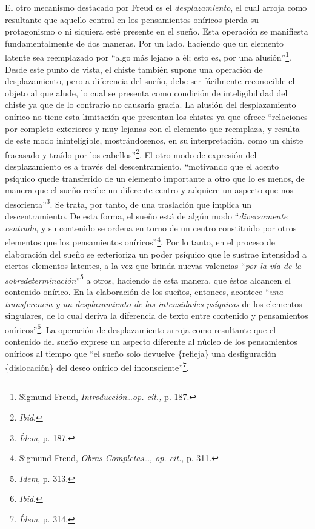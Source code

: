 El otro mecanismo destacado por Freud es el \emph{desplazamiento}, el
cual arroja como resultante que aquello central en los pensamientos
oníricos pierda su protagonismo o ni siquiera esté presente en el sueño.
Esta operación se manifiesta fundamentalmente de dos maneras. Por un
lado, haciendo que un elemento latente sea reemplazado por \enquote{algo más
lejano a él; esto es, por una alusión}\footnote{Sigmund Freud,
  \emph{Introducción\ldots op. cit.,} p. 187.}. Desde este punto de
vista, el chiste también supone una operación de desplazamiento, pero a
diferencia del sueño, debe ser fácilmente reconocible el objeto al que
alude, lo cual se presenta como condición de inteligibilidad del chiste
ya que de lo contrario no causaría gracia. La alusión del desplazamiento
onírico no tiene esta limitación que presentan los chistes ya que ofrece
\enquote{relaciones por completo exteriores y muy lejanas con el elemento que
reemplaza, y resulta de este modo ininteligible, mostrándosenos, en su
interpretación, como un chiste fracasado y traído por los
cabellos}\footnote{\emph{Ibíd}.}. El otro modo de expresión del
desplazamiento es a través del descentramiento, \enquote{motivando que el acento
psíquico quede transferido de un elemento importante a otro que lo es
menos, de manera que el sueño recibe un diferente centro y adquiere un
aspecto que nos desorienta}\footnote{\emph{Ídem}, p. 187.}. Se trata,
por tanto, de una traslación que implica un descentramiento. De esta
forma, el sueño está de algún modo \enquote{\emph{diversamente centrado}, y su
contenido se ordena en torno de un centro constituido por otros
elementos que los pensamientos oníricos}\footnote{Sigmund Freud,
  \emph{Obras Completas\ldots, op. cit.}, p. 311.}. Por lo tanto, en el
proceso de elaboración del sueño se exterioriza un poder psíquico que le
sustrae intensidad a ciertos elementos latentes, a la vez que brinda
nuevas valencias \enquote{\emph{por la vía de la sobredeterminación}}\footnote{\emph{Idem},
  p. 313.} a otros, haciendo de esta manera, que éstos alcancen el
contenido onírico. En la elaboración de los sueños, entonces, acontece
\enquote{\emph{una transferencia y un desplazamiento de las intensidades
psíquicas} de los elementos singulares, de lo cual deriva la diferencia
de texto entre contenido y pensamientos oníricos}\footnote{\emph{Ibid}.}.
La operación de desplazamiento arroja como resultante que el contenido
del sueño exprese un aspecto diferente al núcleo de los pensamientos
oníricos al tiempo que \enquote{el sueño solo devuelve \{refleja\} una
desfiguración \{dislocación\} del deseo onírico del
inconsciente}\footnote{\emph{Ídem}, p. 314.}.

